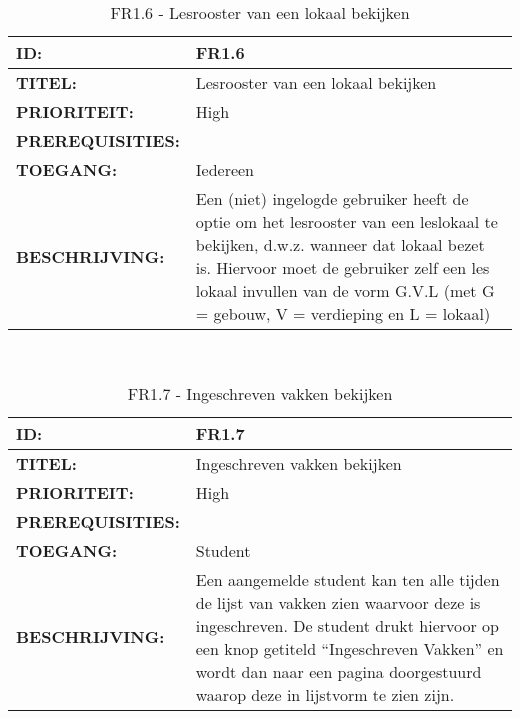 \noindent\begin{table}[H]
            \begin{tabular}{l | p{10cm}}
                \textbf{ID:} & FR1.6 \\ \hline
                \textbf{TITEL:} & Lesrooster van een lokaal bekijken\\ \hline
                \textbf{PRIORITEIT:} &  High \\ \hline
                \textbf{PREREQUISITIES:} & \\ \hline
                \textbf{TOEGANG:} &  Iedereen \\ \hline
                \textbf{BESCHRIJVING:} & Een (niet) ingelogde gebruiker heeft de optie om het lesrooster van een leslokaal te bekijken, d.w.z. wanneer dat lokaal bezet is. 
                                        Hiervoor moet de gebruiker zelf een les lokaal invullen van de vorm G.V.L (met G = gebouw, V = verdieping en L = lokaal)\\
            \end{tabular}\\
            \caption{FR1.6 - Lesrooster van een lokaal bekijken}
            \label{tab:FR1.6 - Lesrooster van een lokaal bekijken}
        \end{table}
   
\noindent\begin{table}[H]
            \begin{tabular}{l | p{10cm}}
                \textbf{ID:} & FR1.7 \\ \hline
                \textbf{TITEL:} & Ingeschreven vakken bekijken\\ \hline
                \textbf{PRIORITEIT:} &  High \\ \hline
                \textbf{PREREQUISITIES:} & \\ \hline
                \textbf{TOEGANG:} &  Student \\ \hline
                \textbf{BESCHRIJVING:} & Een aangemelde student kan ten alle tijden de lijst van vakken zien waarvoor deze is ingeschreven. De student drukt hiervoor op een knop getiteld “Ingeschreven Vakken” en wordt dan naar een pagina doorgestuurd waarop deze in lijstvorm te zien zijn.\\
            \end{tabular}\\
            \caption{FR1.7 - Ingeschreven vakken bekijken}
            \label{tab:FR1.7 - Ingeschreven vakken bekijken}
        \end{table}  

